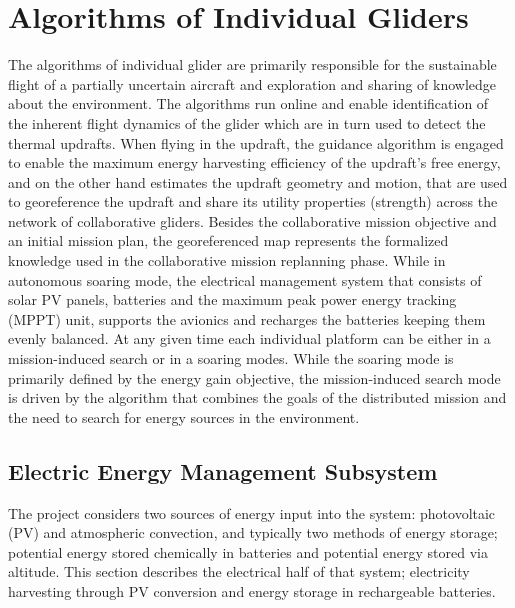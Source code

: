 \documentclass{ifacconf}
\newcommand{\squeezeup}{\vspace{-2.0mm}}
\begin{document}
\section{ Algorithms of Individual Gliders}
\label{sec:IndAlgs}
\squeezeup

The algorithms of individual glider are primarily responsible for the sustainable flight
of a partially uncertain aircraft and exploration and sharing of knowledge about the
environment. The algorithms run online and enable identification of the inherent flight
dynamics of the glider which are in turn used to detect the thermal updrafts. When flying
in the updraft, the guidance algorithm is engaged to enable the maximum energy harvesting
efficiency of the updraft's free energy, and on the other hand estimates the updraft
geometry and motion, that are used to georeference the updraft and share its utility
properties (strength) across the network of collaborative gliders. Besides the
collaborative mission objective and an initial mission plan, the georeferenced map
represents the formalized knowledge used in the collaborative mission replanning phase.
While in autonomous soaring mode, the electrical management system that consists of solar
PV panels, batteries and the maximum peak power energy tracking (MPPT) unit, supports the
avionics and recharges the batteries keeping them evenly balanced. At any given time each
individual platform can be either in a mission-induced search or in a soaring modes.
While the soaring mode is primarily defined by the energy gain objective, the
mission-induced search mode is driven by the algorithm that combines the goals of the
distributed mission and the need to search for energy sources in the environment.
%

\subsection{Electric Energy Management Subsystem}
\label{subsec:Electric} \squeezeup

The project considers two sources of energy input into the system: photovoltaic (PV) and
atmospheric convection, and typically two methods of energy storage; potential energy
stored chemically in batteries and potential energy stored via altitude. This section
describes the electrical half of that system; electricity harvesting through PV
conversion and energy storage in rechargeable batteries.
\end{document}
